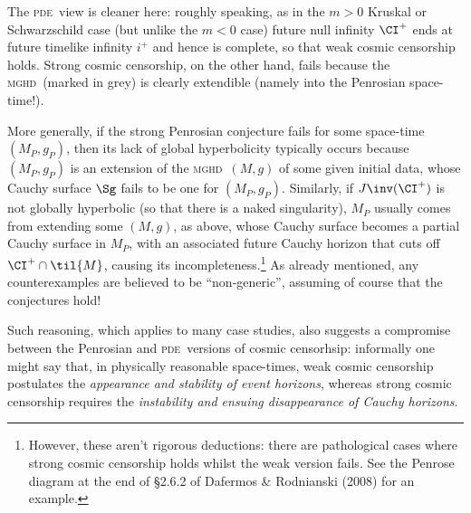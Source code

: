 \documentclass[12pt]{article}
\newcommand{\mghd}{\textsc{mghd}}
\newcommand{\pde}{\textsc{pde}}
\begin{document}
\begin{itemize}
  The \pde\ view is cleaner here: roughly speaking, as in the $m>0$ Kruskal or Schwarzschild case (but unlike the $m<0$ case) future null infinity $\CI^+$ ends at future timelike infinity $i^+$ and hence is complete, so that weak  cosmic censorship holds. Strong  cosmic censorship, on the other hand, fails because the \mghd\ (marked in grey) is clearly extendible (namely into the Penrosian space-time!). 
\end{itemize}
More generally, if the strong Penrosian conjecture fails for some space-time $(M_P,g_P)$, then its lack of global hyperbolicity  typically occurs because $(M_P,g_P)$ is an extension of the \mghd\ $(M,g)$ of some given initial data, whose Cauchy surface $\Sg$ fails to be one for  $(M_P,g_P)$.
Similarly, if $J\inv(\CI^+)$ is not globally hyperbolic (so that there is a naked singularity), $M_P$ usually comes from extending some $(M,g)$, as above, whose Cauchy surface becomes a partial  Cauchy surface in $M_P$, with an associated future Cauchy horizon that cuts off $\CI^+\cap\til{M}$, causing its incompleteness.\footnote{However, these aren't rigorous deductions: there are pathological cases where strong cosmic censorship holds whilst the weak version fails. See the Penrose diagram at the end of \S 2.6.2 of Dafermos \& Rodnianski (2008) for an example.} 
As already mentioned, any counterexamples are believed to be ``non-generic'', assuming of course that the conjectures hold! 

Such reasoning, which applies to many case studies,  also suggests a compromise between the Penrosian and \pde\ versions of cosmic censorhsip: informally  one might say that, in physically reasonable space-times, weak cosmic censorship postulates the \emph{appearance and stability of event horizons}, whereas  strong cosmic censorship requires the \emph{instability and ensuing disappearance of Cauchy horizons}.
\end{document}
